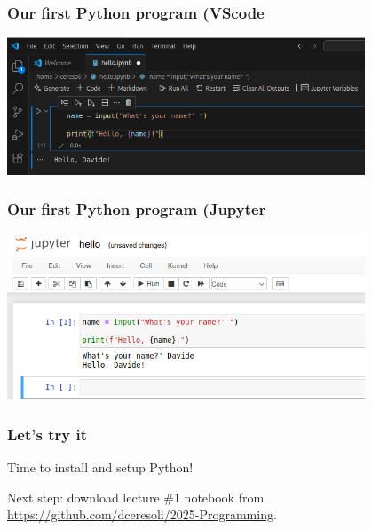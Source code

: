 \documentclass{beamer}
\begin{document}
\begin{frame}[fragile]
  \frametitle{Our first Python program (VScode}
  \begin{center}
  \includegraphics[width=0.8\textwidth]{hello_vscode.png}
  \end{center}
\end{frame}


\begin{frame}[fragile]
  \frametitle{Our first Python program (Jupyter}
  \begin{center}
  \includegraphics[width=0.8\textwidth]{hello_jupyter.png}
  \end{center}
\end{frame}


\begin{frame}[fragile]
  \frametitle{Let's try it}
  \begin{center}
  \Huge{Time to install and setup Python!}
  \end{center}
  \vspace{2cm}
  \begin{center}
  Next step: download lecture \#1 notebook from \url{https://github.com/dceresoli/2025-Programming}.
  \end{center}
\end{frame}



\end{document}
